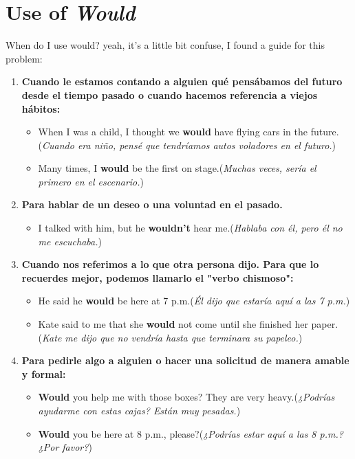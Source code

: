 \documentclass[
	12pt, %
	fleqn, %
	a4paper, %
]{LegrandOrangeBook}
\begin{document}
\section{Use of \textit{Would}}
When do I use would? yeah, it's a little bit confuse, I found a guide for this problem:
\begin{enumerate}
\item \textbf{Cuando le estamos contando a alguien qué pensábamos del futuro desde el tiempo pasado o cuando hacemos referencia a viejos hábitos:}
\begin{itemize}
\item When I was a child, I thought we \textbf{would} have flying cars in the future.(\textit{Cuando era niño, pensé que tendríamos autos voladores en el futuro.})
\item Many times, I \textbf{would} be the first on stage.(\textit{Muchas veces, sería el primero en el escenario.})
\end{itemize}
\item \textbf{Para hablar de un deseo o una voluntad en el pasado.}
\begin{itemize}
\item I talked with him, but he \textbf{wouldn't} hear me.(\textit{Hablaba con él, pero él no me escuchaba.})
\end{itemize}
\item \textbf{Cuando nos referimos a lo que otra persona dijo. Para que lo recuerdes mejor, podemos llamarlo el "verbo chismoso":}
\begin{itemize}
\item He said he \textbf{would} be here at 7 p.m.(\textit{Él dijo que estaría aquí a las 7 p.m.})
\item Kate said to me that she \textbf{would} not come until she finished her paper.(\textit{Kate me dijo que no vendría hasta que terminara su papeleo.})
\end{itemize}
\item \textbf{Para pedirle algo a alguien o hacer una solicitud de manera amable y formal:}
\begin{itemize}
\item \textbf{Would} you help me with those boxes? They are very heavy.(\textit{¿Podrías ayudarme con estas cajas? Están muy pesadas.})
\item \textbf{Would} you be here at 8 p.m., please?(\textit{¿Podrías estar aquí a las 8 p.m.? ¿Por favor?})
\end{itemize}
\end{enumerate}
\end{document}
